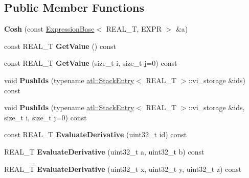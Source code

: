 \subsection*{Public Member Functions}
\begin{DoxyCompactItemize}
\item 
\hypertarget{structatl_1_1_cosh_a01f70e880c5b34f0b1c3fe53cc81cf25}{{\bfseries Cosh} (const \hyperlink{structatl_1_1_expression_base}{Expression\+Base}$<$ R\+E\+A\+L\+\_\+\+T, E\+X\+P\+R $>$ \&a)}\label{structatl_1_1_cosh_a01f70e880c5b34f0b1c3fe53cc81cf25}

\item 
\hypertarget{structatl_1_1_cosh_a5d27569743cf020d80776454bd20b09a}{const R\+E\+A\+L\+\_\+\+T {\bfseries Get\+Value} () const }\label{structatl_1_1_cosh_a5d27569743cf020d80776454bd20b09a}

\item 
\hypertarget{structatl_1_1_cosh_a0fed96ec2f9c805a0263e6ad8fee2024}{const R\+E\+A\+L\+\_\+\+T {\bfseries Get\+Value} (size\+\_\+t i, size\+\_\+t j=0) const }\label{structatl_1_1_cosh_a0fed96ec2f9c805a0263e6ad8fee2024}

\item 
\hypertarget{structatl_1_1_cosh_a017597730da76a5672f98de2c44e2ea1}{void {\bfseries Push\+Ids} (typename \hyperlink{structatl_1_1_stack_entry}{atl\+::\+Stack\+Entry}$<$ R\+E\+A\+L\+\_\+\+T $>$\+::vi\+\_\+storage \&ids) const }\label{structatl_1_1_cosh_a017597730da76a5672f98de2c44e2ea1}

\item 
\hypertarget{structatl_1_1_cosh_aa4dde595aa26d6b04c3fa5992bc5698e}{void {\bfseries Push\+Ids} (typename \hyperlink{structatl_1_1_stack_entry}{atl\+::\+Stack\+Entry}$<$ R\+E\+A\+L\+\_\+\+T $>$\+::vi\+\_\+storage \&ids, size\+\_\+t i, size\+\_\+t j=0) const }\label{structatl_1_1_cosh_aa4dde595aa26d6b04c3fa5992bc5698e}

\item 
\hypertarget{structatl_1_1_cosh_ab1abc64106a6deb29bd071d25754a20c}{const R\+E\+A\+L\+\_\+\+T {\bfseries Evaluate\+Derivative} (uint32\+\_\+t id) const }\label{structatl_1_1_cosh_ab1abc64106a6deb29bd071d25754a20c}

\item 
\hypertarget{structatl_1_1_cosh_aee0067fbe6daa89a626b935940de0776}{R\+E\+A\+L\+\_\+\+T {\bfseries Evaluate\+Derivative} (uint32\+\_\+t a, uint32\+\_\+t b) const }\label{structatl_1_1_cosh_aee0067fbe6daa89a626b935940de0776}

\item 
\hypertarget{structatl_1_1_cosh_ab8393c0bbe1606f3a7e6b4a5d4429090}{R\+E\+A\+L\+\_\+\+T {\bfseries Evaluate\+Derivative} (uint32\+\_\+t x, uint32\+\_\+t y, uint32\+\_\+t z) const }\label{structatl_1_1_cosh_ab8393c0bbe1606f3a7e6b4a5d4429090}


\end{DoxyCompactItemize}
